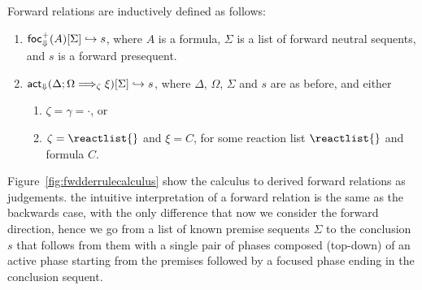\begin{definition}
  Forward relations are inductively defined as follows:

  \begin{enumerate}
  \item $\textsf{foc}^+_{\Downarrow}(A) [\Sigma] \hookrightarrow s$, where $A$ is a formula, $\Sigma$ is a
    list of forward neutral sequents, and $s$ is a forward presequent.
  \item $\textsf{act}_{\Downarrow}(\Delta ; \Omega \Longrightarrow_{\zeta} \xi)  [\Sigma] \hookrightarrow s$,
    where $\Delta$, $\Omega$, $\Sigma$ and $s$ are as before, and either
    \begin{enumerate}
    \item $\zeta = \gamma = \cdot$, or
    \item $\zeta = \reactlist{}$ and $\xi = C$, for some reaction list
      $\reactlist{}$ and formula $C$.
    \end{enumerate}
  \end{enumerate}
\end{definition}

Figure~\ref{fig:fwdderrulecalculus} show the calculus to derived forward
relations as judgements. the intuitive interpretation of a forward relation is
the same as the backwards case, with the only difference that now we consider
the forward direction, hence we go from a list of known premise sequents
$\Sigma$ to the conclusion $s$ that follows from them with a single pair of
phases composed (top-down) of an active phase starting from the premises
followed by a focused phase ending in the conclusion sequent.

